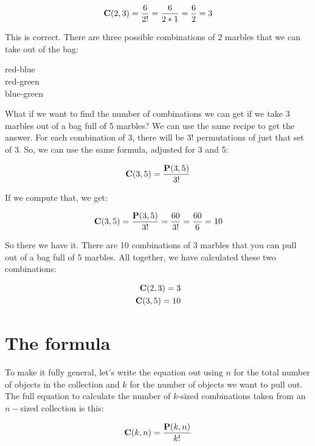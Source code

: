 \documentclass[../../../main.tex]{subfiles}
\begin{document}
\begin{equation*}
  \mathbf{C}(2, 3) = \frac{6}{2!} = \frac{6}{2 * 1} = \frac{6}{2} = 3
\end{equation*}

\noindent
This is correct. There are three possible combinations of 2 marbles that we can take out of the bag:

\begin{center}
  red-blue \\
  red-green \\
  blue-green
\end{center}

\noindent
What if we want to find the number of combinations we can get if we take 3 marbles out of a bag full of 5 marbles? We can use the same recipe to get the answer. For each combination of 3, there will be 3! permutations of just that set of 3. So, we can use the same formula, adjusted for 3 and 5:

\begin{equation*}
  \mathbf{C}(3, 5) = \frac{\mathbf{P}(3, 5)}{3!}
\end{equation*}

\noindent
If we compute that, we get:

\begin{equation*}
  \mathbf{C}(3, 5) = \frac{\mathbf{P}(3, 5)}{3!} = \frac{60}{3!} = \frac{60}{6} = 10
\end{equation*}

\noindent
So there we have it. There are 10 combinations of 3 marbles that you can pull out of a bag full of 5 marbles. All together, we have calculated these two combinations:

\begin{align*}
  \mathbf{C}(2, 3) = 3 \\
  \mathbf{C}(3, 5) = 10
\end{align*}


\section{The formula}

To make it fully general, let's write the equation out using $n$ for the total number of objects in the collection and $k$ for the number of objects we want to pull out. The full equation to calculate the number of $k$-sized combinations taken from an $n-$sized collection is this:

\begin{equation*}
  \mathbf{C}(k, n) = \frac{\mathbf{P}(k, n)}{k!}
\end{equation*}
\end{document}
